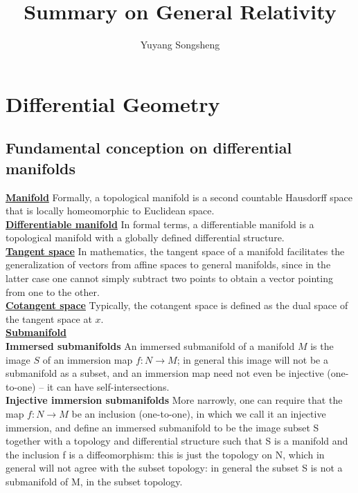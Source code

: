 \documentclass{article}
\author{Yuyang Songsheng}
\title{Summary on General Relativity}
\begin{document}
\maketitle
\section{Differential Geometry}
\subsection{Fundamental conception on differential manifolds}
\href{https://en.wikipedia.org/wiki/Manifold}{\textbf{Manifold}} 
Formally, a topological manifold is a second countable Hausdorff space that is locally homeomorphic to Euclidean space.\\
\href{https://en.wikipedia.org/wiki/Differentiable_manifold}{\textbf{Differentiable manifold}} 
In formal terms, a differentiable manifold is a topological manifold with a globally defined differential structure. \\
\href{https://en.wikipedia.org/wiki/Tangent_space}{\textbf{Tangent space}} 
In mathematics, the tangent space of a manifold facilitates the generalization of vectors from affine spaces to general manifolds, since in the latter case one cannot simply subtract two points to obtain a vector pointing from one to the other.\\
\href{https://en.wikipedia.org/wiki/Cotangent_space}{\textbf{Cotangent space}} 
Typically, the cotangent space is defined as the dual space of the tangent space at $x$.\\
\href{https://en.wikipedia.org/wiki/Submanifold}{\textbf{Submanifold}}\\
\textbf{Immersed submanifolds} An immersed submanifold of a manifold $M$ is the image $S$ of an immersion map $f:N \to M$; in general this image will not be a submanifold as a subset, and an immersion map need not even be injective (one-to-one) – it can have self-intersections.\\
\textbf{Injective immersion submanifolds} More narrowly, one can require that the map $f:N \to M$ be an inclusion (one-to-one), in which we call it an injective immersion, and define an immersed submanifold to be the image subset S together with a topology and differential structure such that S is a manifold and the inclusion f is a diffeomorphism: this is just the topology on N, which in general will not agree with the subset topology: in general the subset S is not a submanifold of M, in the subset topology.\\
\end{document}
